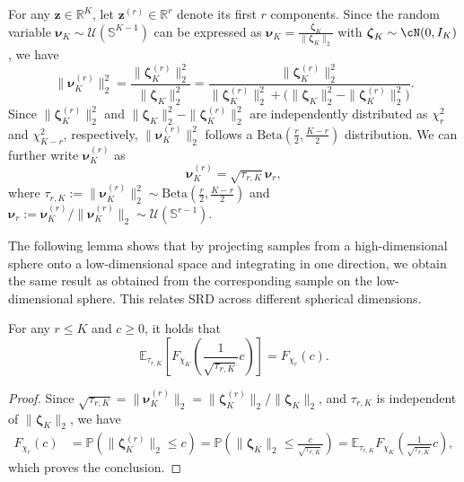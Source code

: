 \documentclass[%
onefignum,onetabnum]{siamonline250211}
\newcommand{\norm}[1]{\| #1 \|}
\newcommand{\bbE}{\mathbb E}
\newcommand{\bbP}{\mathbb P}
\newcommand{\bbR}{\mathbb R}
\newcommand{\bbS}{\mathbb S}
\newcommand{\cU}{\mathcal U} \newcommand{\cV}{\mathcal V}
\begin{document}
For any $\boldsymbol{z}\in\bbR^K$, let $\boldsymbol{z}^{(r)}\in\bbR^r$ denote its first $r$ components. Since the random variable $\boldsymbol{\nu}_K\sim\cU(\bbS^{K-1})$ can be expressed as $\boldsymbol{\nu}_K = \frac{\boldsymbol{\zeta}_K}{\norm{\boldsymbol{\zeta}_K}_2}$ with $\boldsymbol{\zeta}_K\sim\cN(0,I_K)$, we have
\[
\|{\boldsymbol{\nu}_K^{(r)}}\|_2^2=\frac{\norm{\boldsymbol{\zeta}_K^{(r)}}_2^2}{\norm{\boldsymbol{\zeta}_K}_2^2}=\frac{\norm{\boldsymbol{\zeta}_K^{(r)}}_2^2}{\norm{\boldsymbol{\zeta}_K^{(r)}}_2^2+\bigl( \norm{\boldsymbol{\zeta}_K}_2^2-\norm{\boldsymbol{\zeta}_K^{(r)}}_2^2 \bigr)}.
\]
Since $\norm{\boldsymbol{\zeta}_K^{(r)}}_2^2$ and $\norm{\boldsymbol{\zeta}_K}_2^2-\norm{\boldsymbol{\zeta}_K^{(r)}}_2^2$ are independently distributed as $\chi_r^2$ and $\chi_{K-r}^2$, respectively, $\norm{\boldsymbol{\nu}_K^{(r)}}_2^2$ follows a $\mathrm{Beta} \left( \frac{r}{2},\frac{K-r}{2} \right)$ distribution. We can further write $\boldsymbol{\nu}_K^{(r)}$ as
\begin{equation*}
    \boldsymbol{\nu}_K^{(r)}=\sqrt{\tau_{r,K}}\boldsymbol{\nu}_r,
\end{equation*}
where $\tau_{r,K}:=\norm{\boldsymbol{\nu}_K^{(r)}}_2^2\sim \mathrm{Beta} \left( \frac{r}{2},\frac{K-r}{2} \right)$ and $\boldsymbol{\nu}_r:={\boldsymbol{\nu}_K^{(r)}}/{\norm{\boldsymbol{\nu}_K^{(r)}}_2} \sim \cU(\bbS^{r-1})$.

The following lemma shows that by projecting samples from a high-dimensional sphere onto a low-dimensional space and integrating in one direction, we obtain the same result as obtained from the corresponding sample on the low-dimensional sphere. This relates SRD across different spherical dimensions.

\begin{lemma}\label{LEMMA:mean_K}
    For any $r\leq K$ and $c\geq 0$, it holds that
    \begin{equation}\label{Eq:mean_tau}
        \bbE_{\tau_{r,K}} \left[ F_{\chi_K}\left( \frac{1}{\sqrt{\tau_{r,K}}}c \right) \right] =F_{\chi_r}(c).
    \end{equation}
\end{lemma}
\begin{proof}
    Since $\sqrt{\tau_{r,K}}=\norm{\boldsymbol{\nu}_K^{(r)}}_2={\norm{\boldsymbol{\zeta}_K^{(r)}}_2}/{\norm{\boldsymbol{\zeta}_K}_2}$, and $\tau_{r,K}$ is independent of $\norm{\boldsymbol{\zeta}_K}_2$, we have
    \begin{equation*}
        \begin{aligned}
            F_{\chi_r}(c) &= \bbP\left( \norm{\boldsymbol{\zeta}_K^{(r)}}_2\leq c \right) %
            = \bbP\left( \norm{\boldsymbol{\zeta}_K}_2\leq \frac{c}{\sqrt{\tau_{r,K}}} \right) %
            = \bbE_{\tau_{r,K}}F_{\chi_K}\left( \frac{1}{\sqrt{\tau_{r,K}}}c \right),
        \end{aligned}
    \end{equation*}
    which proves the conclusion.
\end{proof}
\end{document}
